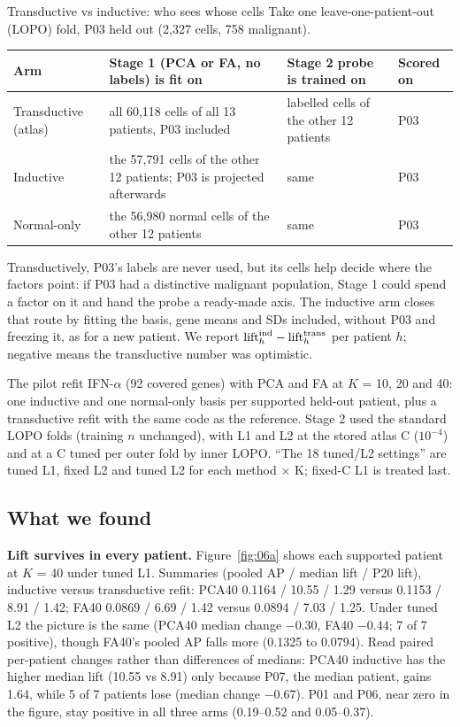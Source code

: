 \begin{explainbox}{Transductive vs inductive: who sees whose cells}
Take one leave-one-patient-out (LOPO) fold, P03 held out (2,327 cells, 758 malignant).

\smallskip
\begin{tabularx}{\linewidth}{@{}p{2.3cm}XXl@{}}
\toprule
Arm & Stage 1 (PCA or FA, no labels) is fit on & Stage 2 probe is trained on & Scored on \\
\midrule
Transductive (atlas) & all 60,118 cells of all 13 patients, P03 included & labelled cells of the other 12 patients & P03 \\
Inductive & the 57,791 cells of the other 12 patients; P03 is projected afterwards & same & P03 \\
Normal-only & the 56,980 normal cells of the other 12 patients & same & P03 \\
\bottomrule
\end{tabularx}

\smallskip
Transductively, P03's labels are never used, but its cells help decide where the factors point: if P03 had a distinctive malignant population, Stage 1 could spend a factor on it and hand the probe a ready-made axis. The inductive arm closes that route by fitting the basis, gene means and SDs included, without P03 and freezing it, as for a new patient. We report $\mathrm{lift}_h^{\text{ind}} - \mathrm{lift}_h^{\text{trans}}$ per patient $h$; negative means the transductive number was optimistic.
\end{explainbox}

The pilot refit IFN-$\alpha$ (92 covered genes) with PCA and FA at $K$ = 10, 20 and 40: one inductive and one normal-only basis per supported held-out patient, plus a transductive refit with the same code as the reference. Stage 2 used the standard LOPO folds (training $n$ unchanged), with L1 and L2 at the stored atlas C ($10^{-4}$) and at a C tuned per outer fold by inner LOPO. ``The 18 tuned/L2 settings'' are tuned L1, fixed L2 and tuned L2 for each method $\times$ K; fixed-C L1 is treated last.

\subsection*{What we found}

\textbf{Lift survives in every patient.} Figure~\ref{fig:06a} shows each supported patient at $K$ = 40 under tuned L1. Summaries (pooled AP / median lift / P20 lift), inductive versus transductive refit: PCA40 0.1164 / 10.55 / 1.29\pp{} versus 0.1153 / 8.91 / 1.42\pp; FA40 0.0869 / 6.69 / 1.42 versus 0.0894 / 7.03 / 1.25. Under tuned L2 the picture is the same (PCA40 median change $-0.30$\pp, FA40 $-0.44$\pp; 7 of 7 positive), though FA40's pooled AP falls more (0.1325 to 0.0794). Read paired per-patient changes rather than differences of medians: PCA40 inductive has the higher median lift (10.55 vs 8.91\pp) only because P07, the median patient, gains 1.64\pp, while 5 of 7 patients lose (median change $-0.67$\pp). P01 and P06, near zero in the figure, stay positive in all three arms (0.19--0.52 and 0.05--0.37\pp).

